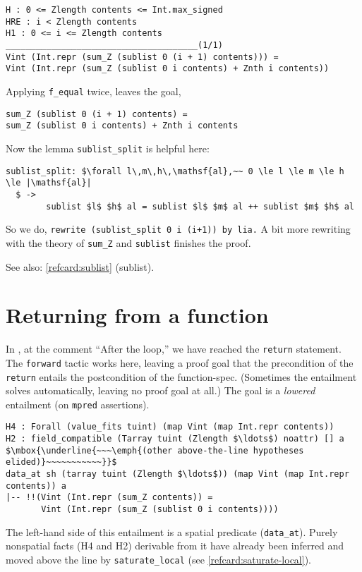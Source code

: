 \documentclass[12pt,fleqn,openany,oneside,showtrims]{memoir}
\begin{document}
\begin{lstlisting}
H : 0 <= Zlength contents <= Int.max_signed
HRE : i < Zlength contents
H1 : 0 <= i <= Zlength contents
______________________________________(1/1)
Vint (Int.repr (sum_Z (sublist 0 (i + 1) contents))) =
Vint (Int.repr (sum_Z (sublist 0 i contents) + Znth i contents))
\end{lstlisting}

Applying \lstinline{f_equal} twice, leaves the goal,
\begin{lstlisting}
sum_Z (sublist 0 (i + 1) contents) =
sum_Z (sublist 0 i contents) + Znth i contents
\end{lstlisting}
Now the lemma \lstinline{sublist_split} is helpful here:\label{sublist-split1}
\begin{lstlisting}
sublist_split: $\forall l\,m\,h\,\mathsf{al},~~ 0 \le l \le m \le h \le |\mathsf{al}|
  $ ->
        sublist $l$ $h$ al = sublist $l$ $m$ al ++ sublist $m$ $h$ al
\end{lstlisting}
So we do,
\lstinline{rewrite (sublist_split 0 i (i+1)) by lia.}
A bit more rewriting with the theory of
\lstinline{sum_Z} and \lstinline{sublist} finishes the proof.

See also: \autoref{refcard:sublist} (sublist).

\chapter{Returning from a function}
\label{refcard:return}
In , at the comment ``After the loop,'' we have reached the \lstinline{return} statement.
The \lstinline{forward} tactic works here, leaving a proof goal
that the precondition of the \lstinline{return}
entails the postcondition of the function-spec.
(Sometimes the entailment solves automatically, leaving no proof goal at all.)
The goal is a \emph{lowered} entailment (on
\lstinline{mpred} assertions).

\begin{lstlisting}
H4 : Forall (value_fits tuint) (map Vint (map Int.repr contents))
H2 : field_compatible (Tarray tuint (Zlength $\ldots$) noattr) [] a
$\mbox{\underline{~~~\emph{(other above-the-line hypotheses elided)}~~~~~~~~~~~}}$
data_at sh (tarray tuint (Zlength $\ldots$)) (map Vint (map Int.repr contents)) a
|-- !!(Vint (Int.repr (sum_Z contents)) =
       Vint (Int.repr (sum_Z (sublist 0 i contents))))
\end{lstlisting}

The left-hand side of this entailment is a
spatial predicate (\lstinline{data_at}).
Purely nonspatial facts (H4 and H2) derivable from it
have already been inferred and
moved above the line by
\lstinline{saturate_local} (see \autoref{refcard:saturate-local}).
\end{document}
